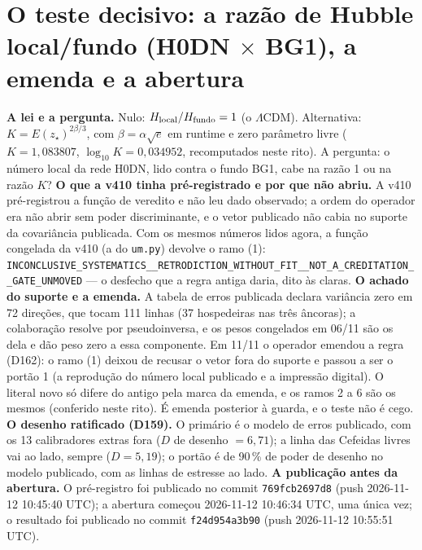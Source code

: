 \section*{O teste decisivo: a razão de Hubble local/fundo (H0DN $\times$ BG1), a emenda e a abertura}
\textbf{A lei e a pergunta.} Nulo: $H_{\rm local}/H_{\rm fundo}=1$ (o $\Lambda$CDM). Alternativa: $K=E(z_\star)^{2\beta/3}$, com $\beta=\alpha\sqrt e$ em runtime e zero parâmetro livre ($K=1{,}083807$, $\log_{10}K=0{,}034952$, recomputados neste rito). A pergunta: o número local da rede H0DN, lido contra o fundo BG1, cabe na razão 1 ou na razão $K$?
\textbf{O que a v410 tinha pré-registrado e por que não abriu.} A v410 pré-registrou a função de veredito e não leu dado observado; a ordem do operador era não abrir sem poder discriminante, e o vetor publicado não cabia no suporte da covariância publicada. Com os mesmos números lidos agora, a função congelada da v410 (a do \texttt{um.py}) devolve o ramo (1): \texttt{INCONCLUSIVE\_\allowbreak{}SYSTEMATICS\_\allowbreak{}\_\allowbreak{}RETRODICTION\_\allowbreak{}WITHOUT\_\allowbreak{}FIT\_\allowbreak{}\_\allowbreak{}NOT\_\allowbreak{}A\_\allowbreak{}CREDITATION\_\allowbreak{}\_\allowbreak{}GATE\_\allowbreak{}UNMOVED} --- o desfecho que a regra antiga daria, dito às claras.
\textbf{O achado do suporte e a emenda.} A tabela de erros publicada declara variância zero em 72 direções, que tocam 111 linhas (37 hospedeiras nas três âncoras); a colaboração resolve por pseudoinversa, e os pesos congelados em 06/11 são os dela e dão peso zero a essa componente. Em 11/11 o operador emendou a regra (D162): o ramo (1) deixou de recusar o vetor fora do suporte e passou a ser o portão 1 (a reprodução do número local publicado e a impressão digital). O literal novo só difere do antigo pela marca da emenda, e os ramos 2 a 6 são os mesmos (conferido neste rito). É emenda posterior à guarda, e o teste não é cego.
\textbf{O desenho ratificado (D159).} O primário é o modelo de erros publicado, com os 13 calibradores extras fora ($D$ de desenho $=6{,}71$); a linha das Cefeidas livres vai ao lado, sempre ($D=5{,}19$); o portão é de 90\,\% de poder de desenho no modelo publicado, com as linhas de estresse ao lado.
\textbf{A publicação antes da abertura.} O pré-registro foi publicado no commit \texttt{769fcb2697d8} (push 2026-11-12 10:45:40 UTC); a abertura começou 2026-11-12 10:46:34 UTC, uma única vez; o resultado foi publicado no commit \texttt{f24d954a3b90} (push 2026-11-12 10:55:51 UTC).
